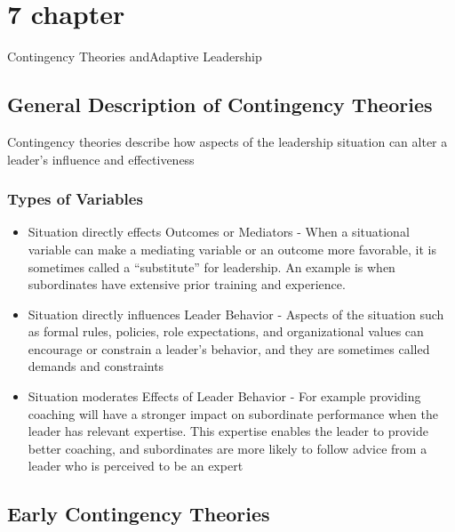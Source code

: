 

\section{7 chapter}
Contingency Theories andAdaptive Leadership


\subsection{General Description of Contingency Theories} %
\label{ssub:general_description_of_contingency_theories}
Contingency theories describe how aspects of the leadership situation can alter a leader’s influence and effectiveness

\subsubsection{Types of Variables} %
\label{ssub:types_of_variables}

\begin{itemize}
	\item Situation directly effects Outcomes or Mediators - When a situational variable can make a mediating variable or an outcome more  favorable, it is sometimes called a “substitute” for leadership. An example is when subordinates have extensive prior training and experience.
	\item Situation directly influences Leader Behavior - Aspects of the situation such as formal rules, policies, role expectations, and organizational values can encourage or constrain a leader’s behavior, and they are sometimes called demands and constraints
	\item Situation moderates Effects of Leader Behavior - For example providing coaching will have a stronger impact on subordinate performance when the leader has relevant expertise. This expertise enables the leader to provide better coaching, and subordinates are more likely to follow advice from a leader who is perceived to be an expert 

\end{itemize}



\subsection{Early Contingency Theories} %
\label{ssub:early_contingency_theories}

